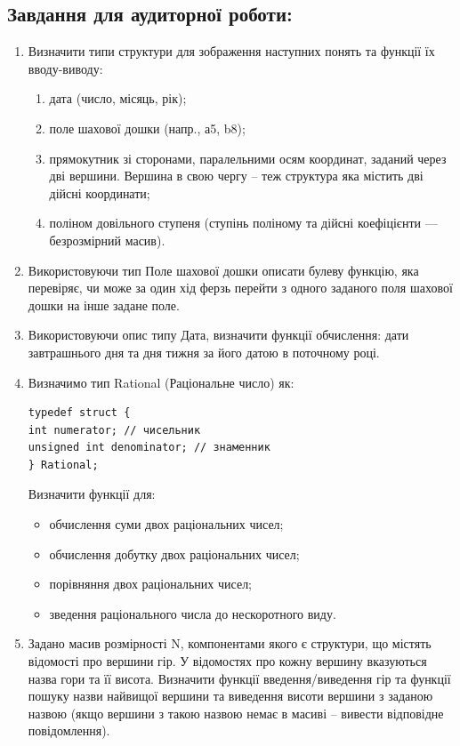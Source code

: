 \documentclass[a5paper,titlepage,openany,twoside,
]
{book_unv}%
\makeatletter
\newcommand{\xslalph}[1]{\expandafter\@xslalph\csname c@#1\endcsname}
\newcommand{\@xslalph}[1]{%
    \ifcase#1\or а\or б\or в\or г\or д\or e\or є\or ж\or з\or i%
    \or й\or к\or л\or м\or н\or о\or п\or р\or с\or т%
    \or у\or ф\or х\or ц\or ч\or ш\or ю\or я\or аа\or бб\or вв%
    \else\@ctrerr\fi%
}
\makeatother
\begin{document}
\begin{enumerate}
\section{Завдання для аудиторної роботи:}

\begin{enumerate}
\def\labelenumi{\arabic{enumi})}
\item
  Визначити типи структури для зображення наступних понять та функції їх вводу-виводу:
 \begin{enumerate}[label=\xslalph*)]
 \item дата (число, місяць, рік);
 \item поле шахової дошки (напр., а5, b8);
 \item прямокутник зі сторонами, паралельними осям координат, заданий через дві вершини.
Вершина в свою чергу -- теж структура яка містить дві дійсні координати;
 \item поліном довільного ступеня (ступінь поліному та дійсні коефіцієнти --- безрозмірний
масив).
 \end{enumerate}

\item
 Використовуючи тип Поле шахової дошки описати булеву функцію, яка
перевіряє, чи може за один хід ферзь перейти з одного заданого поля
шахової дошки на інше задане поле.

\item
 Використовуючи опис типу Дата, визначити функції обчислення:
дати завтрашнього дня та дня тижня за його датою в поточному році.

\item
 Визначимо тип Rational (Раціональне число) як:
\begin{verbatim}
typedef struct {
int numerator; // чисельник
unsigned int denominator; // знаменник
} Rational;
\end{verbatim}

Визначити функції для:
\begin{itemize}
\item обчислення суми двох раціональних чисел;
\item обчислення добутку двох раціональних чисел;
\item порівняння двох раціональних чисел;
\item зведення раціонального числа до нескоротного виду.
\end{itemize}


\item
 Задано масив розмірності N, компонентами якого є структури, 
що містять відомості про вершини гір. У відомостях про 
кожну вершину вказуються назва гори та її висота.
Визначити функції введення/виведення гір та функції пошуку назви
найвищої вершини та виведення висоти вершини з заданою назвою (якщо
вершини з такою назвою немає в масиві -- вивести відповідне
повідомлення).
\end{enumerate}


\end{enumerate}
\end{document}
